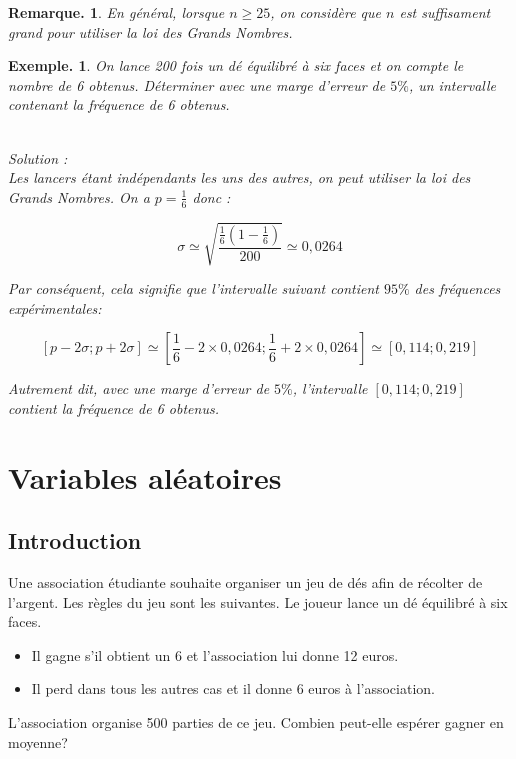 \documentclass[12pt]{article}
\theoremstyle{break}
\newtheorem*{example}{Exemple.}
\newtheorem*{remark}{Remarque.}
\begin{document}
\begin{remark}
  En général, lorsque $n \geqslant 25$, on considère que $n$ est suffisament grand pour utiliser la loi des Grands Nombres.
\end{remark}

\begin{example}
  On lance 200 fois un dé équilibré à six faces et on compte le nombre de 6 obtenus. Déterminer avec une marge d'erreur de $5 \%$, un intervalle contenant la fréquence de 6 obtenus.

  ~\\Solution :\\
  Les lancers étant indépendants les uns des autres, on peut utiliser la loi des Grands Nombres. On a $p=\frac{1}{6}$ donc :

  $$
  \sigma \simeq \sqrt{\frac{\frac{1}{6}\left(1-\frac{1}{6}\right)}{200}} \simeq 0,0264
  $$

  Par conséquent, cela signifie que l'intervalle suivant contient $95 \%$ des fréquences expérimentales:

  $$
  [p-2 \sigma ; p+2 \sigma] \simeq\left[\frac{1}{6}-2 \times 0,0264 ; \frac{1}{6}+2 \times 0,0264\right] \simeq[0,114 ; 0,219]
  $$

  Autrement dit, avec une marge d'erreur de $5 \%$, l'intervalle $[0,114 ; 0,219]$ contient la fréquence de 6 obtenus.
\end{example}

\newpage
\section{Variables aléatoires}
\subsection*{Introduction}
Une association étudiante souhaite organiser un jeu de dés afin de récolter de l'argent. Les règles du jeu sont les suivantes. Le joueur lance un dé équilibré à six faces.

\begin{itemize}
  \item Il gagne s'il obtient un 6 et l'association lui donne 12 euros.
  \item Il perd dans tous les autres cas et il donne 6 euros à l'association.
\end{itemize}

L'association organise 500 parties de ce jeu. Combien peut-elle espérer gagner en moyenne?
\end{document}

